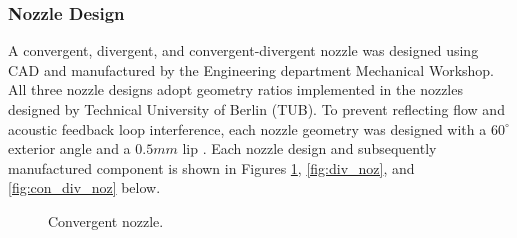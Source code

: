 \subsubsection{Nozzle Design}
A convergent, divergent, and convergent-divergent nozzle was designed using CAD and manufactured by the Engineering department Mechanical Workshop. All three nozzle designs adopt geometry ratios implemented in the nozzles designed by Technical University of Berlin (TUB). To prevent reflecting flow and acoustic feedback loop interference, each nozzle geometry was designed with a $60^\circ$ exterior angle and a $0.5mm$ lip \citep{poldervaart1968photographic}. Each nozzle design and subsequently manufactured component is shown in Figures \ref{fig:con_noz}, \ref{fig:div_noz}, and \ref{fig:con_div_noz} below. 
 
\begin{figure}[!tbh]
  \centering
  \hfill
  \caption{Convergent nozzle.}
  \label{fig:con_noz}
\end{figure}


